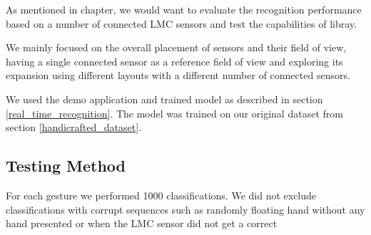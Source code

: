As mentioned in  chapter, we would want to evaluate the recognition performance based on a number of connected LMC sensors and test the capabilities of  libray.

We mainly focused on the overall placement of sensors and their field of view, having a single connected sensor as a reference field of view and exploring its expansion using different layouts with a different number of connected sensors. 

We used the demo application and trained model as described in section \ref{real_time_recognition}. The model was trained on our original dataset from section \ref{handicrafted_dataset}. 

\subsection{Testing Method}

For each gesture we performed 1000 classifications. We did not exclude classifications with corrupt sequences such as randomly floating hand without any hand presented or when the LMC sensor did not get a correct